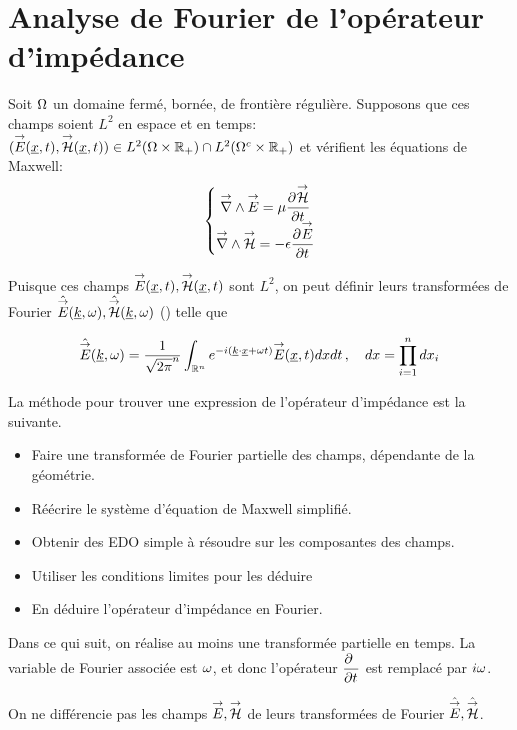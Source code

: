 \section{Analyse de Fourier de l'opérateur d'impédance}
Soit $\OO$ un domaine fermé, bornée, de frontière régulière. Supposons que ces champs soient $L^2$ en espace et en temps: $(\vE(\v{x},t),\vH(\v{x},t)) \in L^2(\OO \times \RR_+) \cap L^2(\OO^c\times\RR_+)$ et vérifient les équations de Maxwell:
\begin{equation}
    \left\lbrace 
    \begin{matrix}
    \vrot \vE = \mu \ddr{t}{\vH} \\
    \vrot \vH = -\eps \ddr{t}{\vE}
    \end{matrix}
    \right.
\end{equation}

Puisque ces champs $\vE(\v{x},t),\vH(\v{x},t)$ sont $L^2$, on peut définir leurs transformées de Fourier $\hat{\vE}(\v{k},\w), \hat{\vH}(\v{k},\w)$ (\cite[Théorème de Plancherel, p.~153]{yosida_functional_1995}) telle que

\begin{equation}
    \hat{\vE} (\v{k},\w) = \frac{1}{\sqrt{2\pi}^n}\int_{\RR^n} e^{-i(\v{k} \cdot \v{x}+\w t)}\vE(\v{x},t) dxdt\,, \quad dx = \prod\limits_{i=1}^n dx_i
\end{equation}

La méthode pour trouver une expression de l'opérateur d'impédance est la suivante.
\begin{itemize}
\item Faire une transformée de Fourier partielle des champs, dépendante de la géométrie.
\item Réécrire le système d'équation de Maxwell simplifié.
\item Obtenir des EDO simple à résoudre sur les composantes des champs.
\item Utiliser les conditions limites pour les déduire 
\item En déduire l'opérateur d'impédance en Fourier.
\end{itemize}

Dans ce qui suit, on réalise au moins une transformée partielle en temps. La variable de Fourier associée est $\w$, et donc l'opérateur $\ddr{t}{~}$ est remplacé par $i\w$.

\begin{tcolorbox}
On ne différencie pas les champs $\vE,\vH$ de leurs transformées de Fourier $\hat \vE, \hat \vH$.
\end{tcolorbox}

